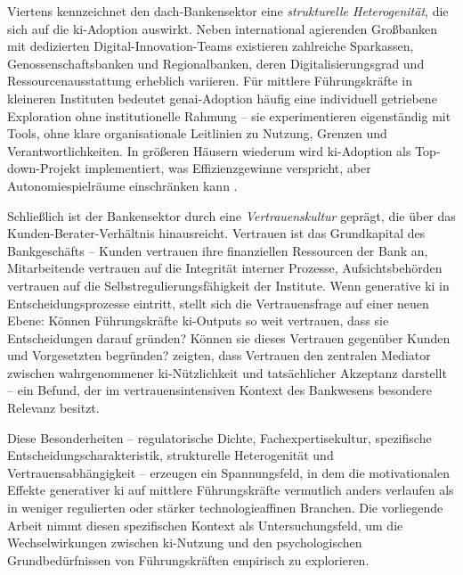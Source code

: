 Viertens kennzeichnet den \acrshort{dach}-Bankensektor eine \textit{strukturelle Heterogenität}, die sich auf die \acrshort{ki}-Adoption auswirkt. Neben international agierenden Großbanken mit dedizierten Digital-Innovation-Teams existieren zahlreiche Sparkassen, Genossenschaftsbanken und Regionalbanken, deren Digitalisierungsgrad und Ressourcenausstattung erheblich variieren. Für mittlere Führungskräfte in kleineren Instituten bedeutet \acrshort{genai}-Adoption häufig eine individuell getriebene Exploration ohne institutionelle Rahmung -- sie experimentieren eigenständig mit Tools, ohne klare organisationale Leitlinien zu Nutzung, Grenzen und Verantwortlichkeiten. In größeren Häusern wiederum wird \acrshort{ki}-Adoption als Top-down-Projekt implementiert, was Effizienzgewinne verspricht, aber Autonomiespielräume einschränken kann \parencite{edwardsManagerialControlFeedback2024}.

Schließlich ist der Bankensektor durch eine \textit{Vertrauenskultur} geprägt, die über das Kunden-Berater-Verhältnis hinausreicht. Vertrauen ist das Grundkapital des Bankgeschäfts -- Kunden vertrauen ihre finanziellen Ressourcen der Bank an, Mitarbeitende vertrauen auf die Integrität interner Prozesse, Aufsichtsbehörden vertrauen auf die Selbstregulierungsfähigkeit der Institute. Wenn generative \gls{ki} in Entscheidungsprozesse eintritt, stellt sich die Vertrauensfrage auf einer neuen Ebene: Können Führungskräfte \acrshort{ki}-Outputs so weit vertrauen, dass sie Entscheidungen darauf gründen? Können sie dieses Vertrauen gegenüber Kunden und Vorgesetzten begründen? \textcite{prasadGenerativeAICatalyst2024} zeigten, dass Vertrauen den zentralen Mediator zwischen wahrgenommener \acrshort{ki}-Nützlichkeit und tatsächlicher Akzeptanz darstellt -- ein Befund, der im vertrauensintensiven Kontext des Bankwesens besondere Relevanz besitzt.

Diese Besonderheiten -- regulatorische Dichte, Fachexpertisekultur, spezifische Entscheidungscharakteristik, strukturelle Heterogenität und Vertrauensabhängigkeit -- erzeugen ein Spannungsfeld, in dem die motivationalen Effekte generativer \gls{ki} auf mittlere Führungskräfte vermutlich anders verlaufen als in weniger regulierten oder stärker technologieaffinen Branchen. Die vorliegende Arbeit nimmt diesen spezifischen Kontext als Untersuchungsfeld, um die Wechselwirkungen zwischen \acrshort{ki}-Nutzung und den psychologischen Grundbedürfnissen von Führungskräften empirisch zu explorieren.
